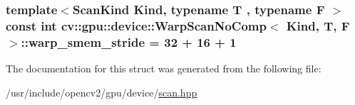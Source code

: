 \hypertarget{structcv_1_1gpu_1_1device_1_1WarpScanNoComp_af09b471a616a150700286e74d72067aa}{
\subsubsection[{warp\-\_\-smem\-\_\-stride}]{\setlength{\rightskip}{0pt plus 5cm}template$<$Scan\-Kind Kind, typename T , typename F $>$ const int {\bf cv\-::gpu\-::device\-::\-Warp\-Scan\-No\-Comp}$<$ Kind, {\bf T}, {\bf F} $>$\-::warp\-\_\-smem\-\_\-stride = 32 + 16 + 1\hspace{0.3cm}{\ttfamily [static]}}}\label{structcv_1_1gpu_1_1device_1_1WarpScanNoComp_af09b471a616a150700286e74d72067aa}


The documentation for this struct was generated from the following file\-:\begin{DoxyCompactItemize}
\item 
/usr/include/opencv2/gpu/device/\hyperlink{scan_8hpp}{scan.\-hpp}\end{DoxyCompactItemize}
